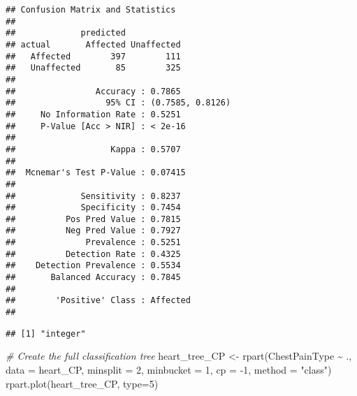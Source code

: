 \documentclass[
]{article}
\newenvironment{Shaded}{\begin{snugshade}}{\end{snugshade}}
\newcommand{\AttributeTok}[1]{\textcolor[rgb]{0.77,0.63,0.00}{#1}}
\newcommand{\CommentTok}[1]{\textcolor[rgb]{0.56,0.35,0.01}{\textit{#1}}}
\newcommand{\DecValTok}[1]{\textcolor[rgb]{0.00,0.00,0.81}{#1}}
\newcommand{\FunctionTok}[1]{\textcolor[rgb]{0.00,0.00,0.00}{#1}}
\newcommand{\NormalTok}[1]{#1}
\newcommand{\OtherTok}[1]{\textcolor[rgb]{0.56,0.35,0.01}{#1}}
\newcommand{\SpecialCharTok}[1]{\textcolor[rgb]{0.00,0.00,0.00}{#1}}
\newcommand{\StringTok}[1]{\textcolor[rgb]{0.31,0.60,0.02}{#1}}
\begin{document}
\begin{verbatim}
## Confusion Matrix and Statistics
## 
##             predicted
## actual       Affected Unaffected
##   Affected        397        111
##   Unaffected       85        325
##                                           
##                Accuracy : 0.7865          
##                  95% CI : (0.7585, 0.8126)
##     No Information Rate : 0.5251          
##     P-Value [Acc > NIR] : < 2e-16         
##                                           
##                   Kappa : 0.5707          
##                                           
##  Mcnemar's Test P-Value : 0.07415         
##                                           
##             Sensitivity : 0.8237          
##             Specificity : 0.7454          
##          Pos Pred Value : 0.7815          
##          Neg Pred Value : 0.7927          
##              Prevalence : 0.5251          
##          Detection Rate : 0.4325          
##    Detection Prevalence : 0.5534          
##       Balanced Accuracy : 0.7845          
##                                           
##        'Positive' Class : Affected        
## 
\end{verbatim}

\begin{Shaded}
\end{Shaded}

\begin{verbatim}
## [1] "integer"
\end{verbatim}

\begin{Shaded}
\begin{Highlighting}[]
\CommentTok{\# Create the full classification tree}
\NormalTok{heart\_tree\_CP }\OtherTok{\textless{}{-}} \FunctionTok{rpart}\NormalTok{(ChestPainType }\SpecialCharTok{\textasciitilde{}}\NormalTok{ ., }
                   \AttributeTok{data =}\NormalTok{ heart\_CP, }
                   \AttributeTok{minsplit =} \DecValTok{2}\NormalTok{, }
                   \AttributeTok{minbucket =} \DecValTok{1}\NormalTok{, }
                   \AttributeTok{cp =} \SpecialCharTok{{-}}\DecValTok{1}\NormalTok{,}
                   \AttributeTok{method =} \StringTok{"class"}\NormalTok{)}
\FunctionTok{rpart.plot}\NormalTok{(heart\_tree\_CP, }\AttributeTok{type=}\DecValTok{5}\NormalTok{)}
\end{Highlighting}
\end{Shaded}
\end{document}
